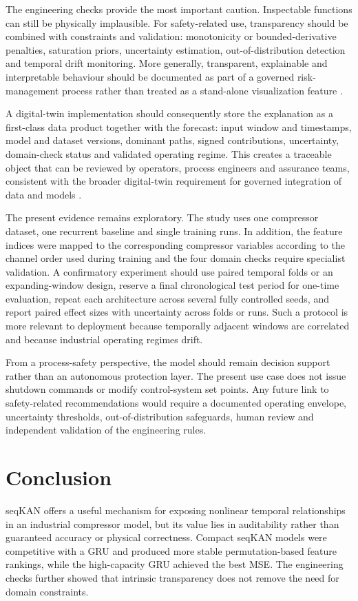 \documentclass[conference]{IEEEtran}
\begin{document}
The engineering checks provide the most important caution. Inspectable functions can still be physically implausible. For safety-related use, transparency should be combined with constraints and validation: monotonicity or bounded-derivative penalties, saturation priors, uncertainty estimation, out-of-distribution detection and temporal drift monitoring. More generally, transparent, explainable and interpretable behaviour should be documented as part of a governed risk-management process rather than treated as a stand-alone visualization feature \cite{nist2023}.

A digital-twin implementation should consequently store the explanation as a first-class data product together with the forecast: input window and timestamps, model and dataset versions, dominant paths, signed contributions, uncertainty, domain-check status and validated operating regime. This creates a traceable object that can be reviewed by operators, process engineers and assurance teams, consistent with the broader digital-twin requirement for governed integration of data and models \cite{perno2022,peterson2025}.

The present evidence remains exploratory. The study uses one compressor dataset, one recurrent baseline and single training runs. In addition, the feature indices were mapped to the corresponding compressor
variables according to the channel order used during training and the four domain checks require specialist validation. A confirmatory experiment should use paired temporal folds or an expanding-window design, reserve a final chronological test period for one-time evaluation, repeat each architecture across several fully controlled seeds, and report paired effect sizes with uncertainty across folds or runs. Such a protocol is more relevant to deployment because temporally adjacent windows are correlated and because industrial operating regimes drift.

From a process-safety perspective, the model should remain decision support rather than an autonomous protection layer. The present use case does not issue shutdown commands or modify control-system set points. Any future link to safety-related recommendations would require a documented operating envelope, uncertainty thresholds, out-of-distribution safeguards, human review and independent validation of the engineering rules.

\section{Conclusion}
seqKAN offers a useful mechanism for exposing nonlinear temporal relationships in an industrial compressor model, but its value lies in auditability rather than guaranteed accuracy or physical correctness. Compact seqKAN models were competitive with a GRU and produced more stable permutation-based feature rankings, while the high-capacity GRU achieved the best MSE. The engineering checks further showed that intrinsic transparency does not remove the need for domain constraints.
\end{document}
